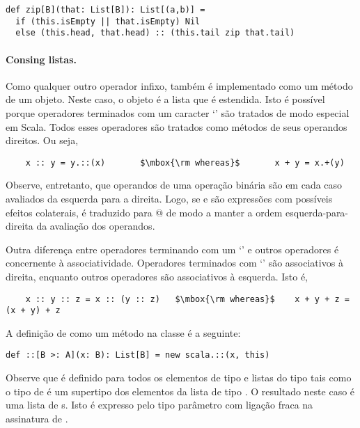 \begin{lstlisting}
def zip[B](that: List[B]): List[(a,b)] =
  if (this.isEmpty || that.isEmpty) Nil
  else (this.head, that.head) :: (this.tail zip that.tail)
\end{lstlisting}

\paragraph{Consing listas.}

Como qualquer outro operador infixo, \code{::} também é implementado como um 
método de um objeto. Neste caso, o objeto é a lista que é estendida. Isto é 
possível porque operadores terminados com um caracter `\code{:}' são tratados
de modo especial em Scala. Todos esses operadores são tratados como métodos 
de seus operandos direitos. Ou seja, 
\begin{lstlisting}
    x :: y = y.::(x)       $\mbox{\rm whereas}$       x + y = x.+(y)                  
\end{lstlisting}
Observe, entretanto, que operandos de uma operação binária são em cada caso
avaliados da esquerda para a direita. Logo, se  e  são 
expressões com possíveis efeitos colaterais,  é traduzido para 
@ de modo a manter a ordem esquerda-para-direita
da avaliação dos operandos.

Outra diferença entre operadores terminando com um `\code{:}' e outros 
operadores é concernente à associatividade. Operadores terminados com 
`\code{:}' são associativos à direita, enquanto outros operadores são 
associativos à esquerda. Isto é,
\begin{lstlisting}
    x :: y :: z = x :: (y :: z)   $\mbox{\rm whereas}$    x + y + z = (x + y) + z
\end{lstlisting}


A definição de \code{::} como um método na classe  é a seguinte:
\begin{lstlisting}
def ::[B >: A](x: B): List[B] = new scala.::(x, this)
\end{lstlisting}
Observe que \code{::} é definido para todos os elementos  de tipo
 e listas do tipo  tais como o tipo  de  é 
um supertipo dos elementos da lista de tipo . O resultado neste caso é 
uma lista de s. Isto é expresso pelo tipo parâmetro  com ligação 
fraca  na assinatura de \code{::}.


